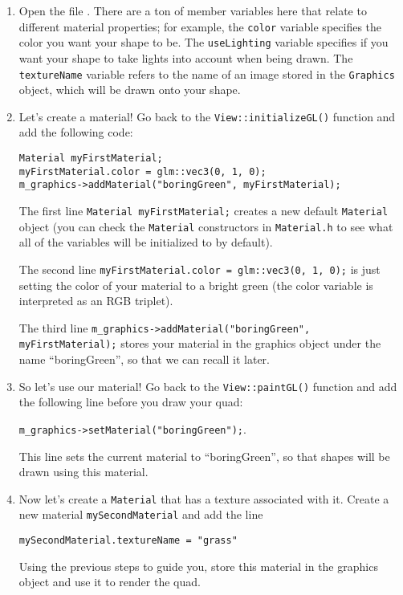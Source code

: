 \documentclass{cs195u}
\begin{document}
\begin{enumerate}
\item Open the file . There are a ton of member variables here that relate to different material properties; for example, the \texttt{color} variable specifies the color you want your shape to be. The \texttt{useLighting} variable specifies if you want your shape to take lights into account when being drawn. The \texttt{textureName} variable refers to the name of an image stored in the \texttt{Graphics} object, which will be drawn onto your shape.

\item Let’s create a material! Go back to the \texttt{View::initializeGL()} function and add the following code:

         \texttt{Material myFirstMaterial;}\\
         \texttt{myFirstMaterial.color = glm::vec3(0, 1, 0);}\\
         \texttt{m\_graphics->addMaterial("boringGreen", myFirstMaterial);}

The first line \texttt{Material myFirstMaterial;} creates a new default \texttt{Material} object (you can check the \texttt{Material} constructors in \texttt{Material.h} to see what all of the variables will be initialized to by default).

The second line \texttt{myFirstMaterial.color = glm::vec3(0, 1, 0);} is just setting the color of your material to a bright green (the color variable is interpreted as an RGB triplet).

The third line \texttt{m\_graphics->addMaterial("boringGreen", myFirstMaterial);} stores your material in the graphics object under the name “boringGreen”, so that we can recall it later.

\item So let’s use our material! Go back to the \texttt{View::paintGL()} function and add the following line before you draw your quad:

         \texttt{m\_graphics->setMaterial("boringGreen");}.
         
This line sets the current material to “boringGreen”, so that shapes will be drawn using this material.

\item Now let’s create a \texttt{Material} that has a texture associated with it. Create a new material \texttt{mySecondMaterial} and add the line

\texttt{mySecondMaterial.textureName = "grass"}

Using the previous steps to guide you, store this material in the graphics object and use it to render the quad.
\end{enumerate}
\end{document}
